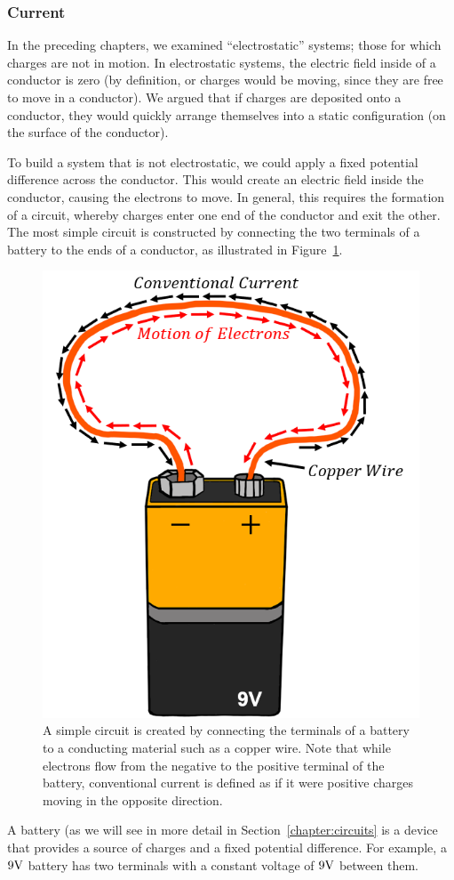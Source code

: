 \subsubsection{Current}

In the preceding chapters, we examined ``electrostatic'' systems; those for which charges are not in motion. In electrostatic systems, the electric field inside of a conductor is zero (by definition, or charges would be moving, since they are free to move in a conductor). We argued that if charges are deposited onto a conductor, they would quickly arrange themselves into a static configuration (on the surface of the conductor).

To build a system that is not electrostatic, we could apply a fixed potential difference across the conductor. This would create an  electric field inside the conductor, causing the electrons to move. In general, this requires the formation of a circuit, whereby charges enter one end of the conductor and exit the other. The most simple circuit is constructed by connecting the two terminals of a battery to the ends of a conductor, as illustrated in Figure~\ref{fig:current:simplecircuit}.

\begin{figure}[!htbp]
\centering
\includegraphics[width=0.4\linewidth]{files/simplecircuit-c553cfef088a33e4ea40ba088bf27fb7.png}
\caption[]{A simple circuit is created by connecting the terminals of a battery to a conducting material such as a copper wire. Note that while electrons flow from the negative to the positive terminal of the battery, conventional current is defined as if it were positive charges moving in the opposite direction.}
\label{fig:current:simplecircuit}
\end{figure}

A battery (as we will see in more detail in Section~\ref{chapter:circuits} is a device that provides a source of charges and a fixed potential difference. For example, a $9 {\rm V}$ battery has two terminals with a constant voltage of $9 {\rm V}$ between them.


